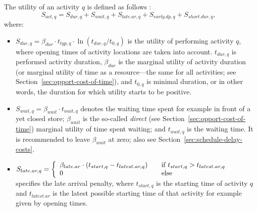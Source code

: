 The utility of an activity $q$ is defined as follows \citep[see also][p.377ff]{CharyparNagel2005ga4acts}:
\begin{equation}
S_{act,q} = S_{dur,q} + S_{wait,q} + S_{late.ar,q} + S_{early.dp,q} + S_{short.dur,q},
\label{eq:matsimUTFact}
\end{equation}
where:
\begin{itemize}\styleItemize
\item $S_{dur,q}= \beta_{dur} \cdot t_{typ,q} \cdot \ln(t_{dur,q}/t_{0,q})$ 
%
is the utility of performing activity $q$, where opening times of activity locations are taken into account. $t_{dur,q}$ is performed activity duration, $\beta_{dur}$ is the marginal utility of activity duration (or marginal utility of time as a resource---the same for all activities; see Section~\ref{sec:opport-cost-of-time}),
and $t_{0,q}$ is minimal duration, or in other words, the duration for which utility starts to be positive. 
%

\medskip

\item $ S_{wait,q} = \beta_{wait} \cdot t_{wait,q}$ 
%
  denotes the waiting time spent for example in front of a yet closed store; $\beta_{wait}$ is the so-called \emph{direct} (see Section~\ref{sec:opport-cost-of-time}) marginal utility of time spent waiting; and $t_{wait,q}$ is the waiting time.  It is recommended to leave $\beta_{wait}$ at zero; also see Section~\ref{sec:schedule-delay-costs}.



\medskip

\item $S_{late.ar,q}= \left\{
  \begin{array}{l l}
    \beta_{late.ar} \cdot (t_{start,q} - t_{latest.ar,q}) & \quad \text{if $t_{start,q} > t_{latest.ar,q}$}\\
    0 & \quad \text{else}
  \end{array} \right.$
%  
  specifies the late arrival penalty, where $t_{start,q}$ is the starting time of activity $q$ and $t_{latest.ar}$ is the latest possible starting time of that activity for example given by opening times.


\end{itemize}
